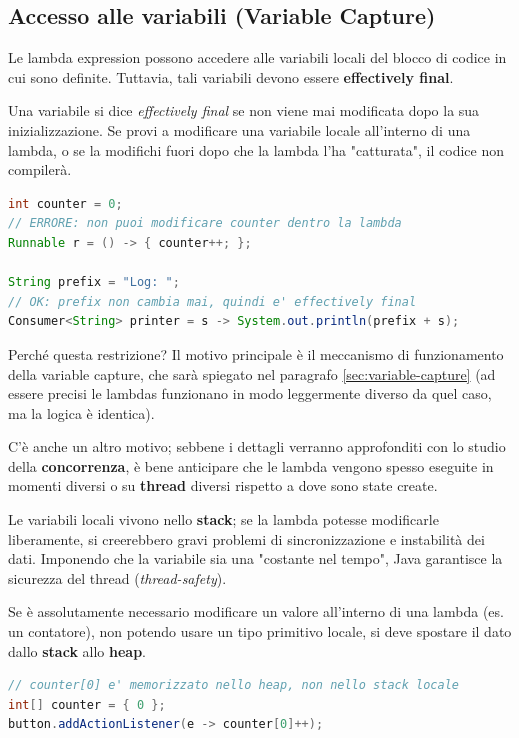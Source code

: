 \subsection{Accesso alle variabili (Variable Capture)}

Le lambda expression possono accedere alle variabili locali del blocco di codice in cui sono definite. Tuttavia, tali variabili devono essere \textbf{effectively final}.

\begin{tip}
Una variabile si dice \textit{effectively final} se non viene mai modificata dopo la sua inizializzazione. Se provi a modificare una variabile locale all'interno di una lambda, o se la modifichi fuori dopo che la lambda l'ha "catturata", il codice non compilerà.
\end{tip}

\begin{lstlisting}[language=Java]
int counter = 0;
// ERRORE: non puoi modificare counter dentro la lambda
Runnable r = () -> { counter++; }; 

String prefix = "Log: ";
// OK: prefix non cambia mai, quindi e' effectively final
Consumer<String> printer = s -> System.out.println(prefix + s);
\end{lstlisting} 

Perché questa restrizione? Il motivo principale è il meccanismo di funzionamento della variable capture, che sarà spiegato nel paragrafo \ref{sec:variable-capture} (ad essere precisi le lambdas funzionano in modo leggermente diverso da quel caso, ma la logica è identica). 

C'è anche un altro motivo; sebbene i dettagli verranno approfonditi con lo studio della \textbf{concorrenza}, è bene anticipare che le lambda vengono spesso eseguite in momenti diversi o su \textbf{thread} diversi rispetto a dove sono state create. 

Le variabili locali vivono nello \textbf{stack}; se la lambda potesse modificarle liberamente, si creerebbero gravi problemi di sincronizzazione e instabilità dei dati. Imponendo che la variabile sia una "costante nel tempo", Java garantisce la sicurezza del thread (\textit{thread-safety}).


Se è assolutamente necessario modificare un valore all'interno di una lambda (es. un contatore), non potendo usare un tipo primitivo locale, si deve spostare il dato dallo \textbf{stack} allo \textbf{heap}.

\begin{lstlisting}[language=Java, caption={Aggirare il vincolo con un array}]
// counter[0] e' memorizzato nello heap, non nello stack locale
int[] counter = { 0 }; 
button.addActionListener(e -> counter[0]++); 
\end{lstlisting}

